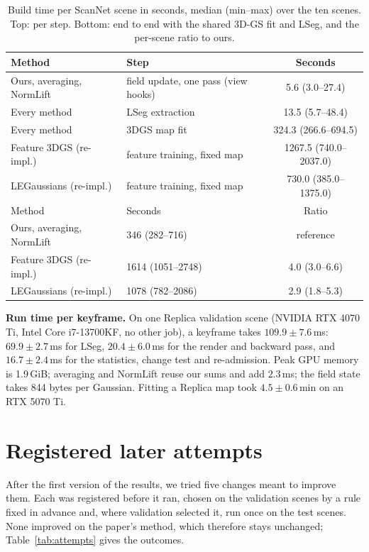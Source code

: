 \documentclass[journal]{IEEEtran}
\begin{document}
\begin{table}[t]
\centering
\caption{Build time per ScanNet scene in seconds, median (min--max) over the ten scenes. Top: per step. Bottom: end to end with the shared 3D-GS fit and LSeg, and the per-scene ratio to ours.}
\label{tab:cost}
\footnotesize
\setlength{\tabcolsep}{3pt}
\begin{tabular}{@{}llc@{}}
\toprule
Method & Step & Seconds\\
\midrule
Ours, averaging, NormLift & field update, one pass (view hooks) & 5.6 (3.0--27.4)\\
Every method & LSeg extraction & 13.5 (5.7--48.4)\\
Every method & 3DGS map fit & 324.3 (266.6--694.5)\\
Feature 3DGS (re-impl.) & feature training, fixed map & 1267.5 (740.0--2037.0)\\
LEGaussians (re-impl.) & feature training, fixed map & 730.0 (385.0--1375.0)\\
\midrule
Method & Seconds & Ratio\\
\midrule
Ours, averaging, NormLift & 346 (282--716) & reference\\
Feature 3DGS (re-impl.) & 1614 (1051--2748) & 4.0 (3.0--6.6)\\
LEGaussians (re-impl.) & 1078 (782--2086) & 2.9 (1.8--5.3)\\
\bottomrule
\end{tabular}
\end{table}



\textbf{Run time per keyframe.} On one Replica validation scene (NVIDIA RTX 4070 Ti, Intel Core i7-13700KF, no other job), a keyframe takes $109.9\pm7.6$\,ms: $69.9\pm2.7$\,ms for LSeg, $20.4\pm6.0$\,ms for the render and backward pass, and $16.7\pm2.4$\,ms for the statistics, change test and re-admission. Peak GPU memory is 1.9\,GiB; averaging and NormLift reuse our sums and add $2.3$\,ms; the field state takes 844 bytes per Gaussian. Fitting a Replica map took $4.5\pm0.6$\,min on an RTX 5070 Ti.
\section{Registered later attempts}
\label{supp:attempts}
After the first version of the results, we tried five changes meant to improve them. Each was registered before it ran, chosen on the validation scenes by a rule fixed in advance and, where validation selected it, run once on the test scenes. None improved on the paper's method, which therefore stays unchanged; Table~\ref{tab:attempts} gives the outcomes.
\end{document}
